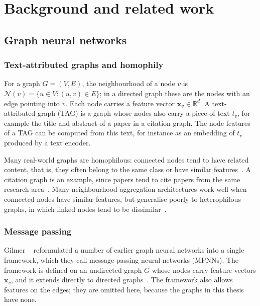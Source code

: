 \chapter{Background and related work}
\label{chap:background}

\section{Graph neural networks}
\label{sec:gnn}

\subsection{Text-attributed graphs and homophily}
\label{sec:tag}

For a graph $G = (V, E)$, the neighbourhood of a node $v$ is $\mathcal{N}(v) = \{u \in V : (u, v) \in E\}$; in a directed graph these are the nodes with an edge pointing into $v$. Each node carries a feature vector $\mathbf{x}_v \in \mathbb{R}^d$. A text-attributed graph (TAG) is a graph whose nodes also carry a piece of text $t_v$, for example the title and abstract of a paper in a citation graph. The node features of a TAG can be computed from this text, for instance as an embedding of $t_v$ produced by a text encoder.

Many real-world graphs are homophilous: connected nodes tend to have related content, that is, they often belong to the same class or have similar features~\cite{zhu2020beyond}. A citation graph is an example, since papers tend to cite papers from the same research area~\cite{zhu2020beyond}. Many neighbourhood-aggregation architectures work well when connected nodes have similar features, but generalise poorly to heterophilous graphs, in which linked nodes tend to be dissimilar~\cite{zhu2020beyond}.

\subsection{Message passing}
\label{sec:message-passing}

Gilmer \etal~\cite{gilmer2017neural} reformulated a number of earlier graph neural networks into a single framework, which they call message passing neural networks (MPNNs). The framework is defined on an undirected graph $G$ whose nodes carry feature vectors $\mathbf{x}_v$, and it extends directly to directed graphs~\cite{gilmer2017neural}. The framework also allows features on the edges; they are omitted here, because the graphs in this thesis have none.

